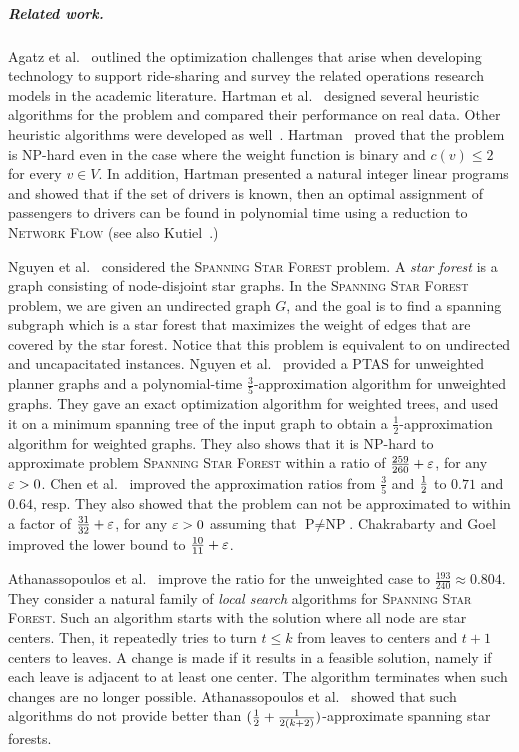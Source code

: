 
\subparagraph{Related work.}
%
Agatz et al.~\cite{agatz2012optimization} outlined the optimization
challenges that arise when developing technology to support
ride-sharing and survey the related operations research models in the
academic literature.
%
Hartman et al.~\cite{hartman2014theory} designed
several heuristic algorithms for the \carpool problem and compared
their performance on real data.  Other heuristic algorithms were
developed as well~\cite{knapen2014exploiting}.
%
Hartman~\cite{hartman2013optimal} proved that the \carpool problem is
NP-hard even in the case where the weight function is binary and
$c(v) \leq 2$ for every $v \in V$.  In addition, Hartman presented a
natural integer linear programs and showed that if the set of drivers
is known, then an optimal assignment of passengers to drivers can be
found in polynomial time using a reduction to \textsc{Network Flow}
(see also Kutiel~\cite{kutiel2016}.)

Nguyen et al.~\cite{nguyen2008approximating} considered
the \textsc{Spanning Star Forest} problem.  A \emph{star forest} is a
graph consisting of node-disjoint star graphs.  In
the \textsc{Spanning Star Forest} problem, we are given an undirected
graph $G$, and the goal is to find a spanning subgraph which is a star
forest that maximizes the weight of edges that are covered by the star
forest.  Notice that this problem is equivalent to \carpool on
undirected and uncapacitated instances.
%
Nguyen et al.~\cite{nguyen2008approximating} provided a PTAS for
unweighted planner graphs and a polynomial-time
$\frac{3}{5}$-approximation algorithm for unweighted graphs.  They
gave an exact optimization algorithm for weighted trees, and used it
on a minimum spanning tree of the input graph to obtain a
$\frac{1}{2}$-approximation algorithm for weighted graphs.  They also
shows that it is NP-hard to approximate problem \textsc{Spanning Star
Forest} within a ratio of $\frac{259}{260}+\varepsilon$, for any $\varepsilon>0$.
%
%
Chen et al.~\cite{CENRRS13} improved the approximation ratios from
$\frac{3}{5}$ and $\frac{1}{2}$ to $0.71$ and $0.64$, resp.  They also
showed that the problem can not be approximated to within a factor of
$\frac{31}{32} + \varepsilon$, for any $\varepsilon > 0$ assuming that
$\text{P} \neq \text{NP}$.
%
Chakrabarty and Goel~\cite{ChakrabartyGoel10} improved the lower bound
to $\frac{10}{11} + \varepsilon$.

Athanassopoulos et al.~\cite{ACKK09} improve the ratio for the
unweighted case to $\frac{193}{240} \approx 0.804$.
%
They consider a natural family of \emph{local search} algorithms
for \textsc{Spanning Star Forest}.  Such an algorithm starts with the
solution where all node are star centers.  Then, it repeatedly tries
to turn $t \leq k$ from leaves to centers and $t+1$ centers to leaves.
A change is made if it results in a feasible solution, namely if each
leave is adjacent to at least one center.  The algorithm terminates
when such changes are no longer possible.  Athanassopoulos et
al.~\cite{ACKK09} showed that such algorithms do not provide better
than $(\frac{1}{2} + \frac{1}{2(k+2)})$-approximate spanning star forests.

